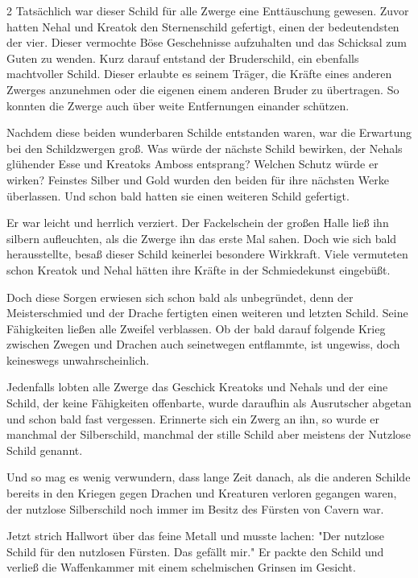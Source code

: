 \documentclass[10pt, a4paper, oneside]{book}
\begin{document}
\begin{multicols}{2}
Tatsächlich war dieser Schild für alle Zwerge eine Enttäuschung gewesen. Zuvor hatten Nehal und Kreatok den Sternenschild gefertigt, einen der  bedeutendsten der vier. Dieser vermochte Böse Geschehnisse aufzuhalten  und das Schicksal zum Guten zu wenden. Kurz darauf entstand der Bruderschild, ein ebenfalls machtvoller Schild.  Dieser erlaubte es seinem Träger, die Kräfte eines anderen Zwerges anzunehmen oder die eigenen einem anderen Bruder zu übertragen. So konnten die Zwerge auch über weite Entfernungen einander schützen.\bigskip

Nachdem diese beiden wunderbaren Schilde entstanden waren, war die Erwartung bei den Schildzwergen groß. Was würde der nächste Schild bewirken, der Nehals glühender Esse und Kreatoks Amboss entsprang? Welchen Schutz würde er wirken? Feinstes Silber und Gold wurden den beiden für ihre nächsten Werke überlassen. Und schon bald hatten sie einen weiteren Schild gefertigt.

Er war leicht und herrlich verziert. Der Fackelschein der großen Halle ließ ihn silbern aufleuchten, als die Zwerge ihn das erste Mal sahen. Doch wie sich bald herausstellte, besaß dieser Schild keinerlei besondere Wirkkraft. Viele vermuteten schon Kreatok und Nehal hätten ihre Kräfte in der Schmiedekunst eingebüßt.\bigskip

Doch diese Sorgen erwiesen sich schon bald als unbegründet, denn der Meisterschmied und der Drache fertigten einen weiteren und letzten Schild. Seine Fähigkeiten ließen alle Zweifel verblassen. Ob der bald darauf folgende Krieg zwischen Zwegen und Drachen auch seinetwegen entflammte, ist ungewiss, doch keineswegs unwahrscheinlich.

Jedenfalls lobten alle Zwerge das Geschick Kreatoks und Nehals und der eine Schild, der keine Fähigkeiten offenbarte, wurde daraufhin als Ausrutscher abgetan und schon bald fast vergessen. Erinnerte sich ein Zwerg an ihn, so wurde er manchmal der Silberschild, manchmal der stille Schild aber meistens der Nutzlose Schild genannt.\bigskip

Und so mag es wenig verwundern, dass lange Zeit danach, als die anderen Schilde bereits in den Kriegen gegen Drachen und Kreaturen verloren gegangen waren, der nutzlose Silberschild noch immer im Besitz des Fürsten von Cavern war.\bigskip

Jetzt strich Hallwort über das feine Metall und musste lachen: "Der nutzlose Schild für den nutzlosen Fürsten. Das gefällt mir." Er packte den Schild und verließ die Waffenkammer mit einem schelmischen Grinsen im Gesicht.\bigskip


\end{multicols}
\end{document}
